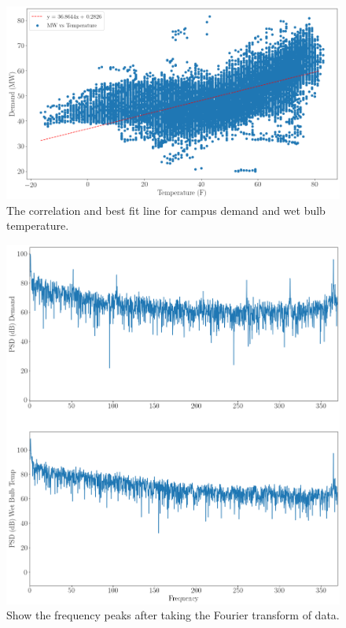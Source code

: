 \begin{figure}
  \centering
  \includegraphics[width=\textwidth]{demandtempcorr}
  \caption{The correlation and best fit line for campus demand and wet bulb
  temperature.}
  \label{fig:tempcorrelation}
\end{figure}

\begin{figure}
  \centering
  \includegraphics[width=\textwidth]{demandtempfreq}
  \caption{Show the frequency peaks after taking the Fourier transform of data.}
  \label{fig:demandfreq}
\end{figure}

